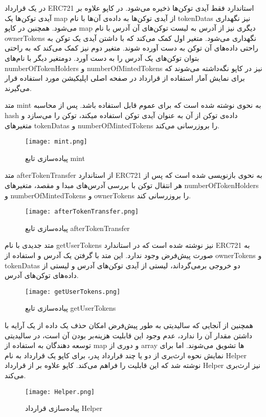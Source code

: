 در یک قرارداد ERC721 استاندارد فقط آیدی توکن‌ها ذخیره می‌شود. در کاپو علاوه بر آیدی توکن‌ها یک map از آیدی توکن‌ها به داده‌ی آن‌ها با نام tokenDatas نیز نگهداری می‌شود. همچنین در کاپو map دیگری نیز از آدرس به لیست توکن‌های آن آدرس با نام ownerTokens نگهداری می‌شود. متغیر اول کمک می‌کند که با داشتن آیدی یک توکن به راحتی داده‌های آن توکن به دست آورده شوند. متغیر دوم نیز کمک می‌کند که به راحتی بتوان توکن‌های یک آدرس را به دست آورد. دومتغیر دیگر با نام‌های numberOfTokenHolders و numberOfMintedTokens نیز در کاپو نگه‌داشته می‌شوند که برای نمایش آمار استفاده از قرارداد در صفحه اصلی اپلیکیشن مورد استفاده قرار می‌گیرند.

متد mint به نحوی نوشته شده است که برای عموم قابل استفاده باشد. پس از محاسبه hash داده‌ی توکن از آن به عنوان آیدی توکن استفاده میکند، توکن را می‌سازد و متغیرهای tokenDatas و numberOfMintedTokens را بروزرسانی می‌کند.

\begin{figure}[ht]
\centerline{\texttt{[image: mint.png]}}
\caption{پیاده‌سازی تابع mint}
\label{fig:mint}
\end{figure}

متد afterTokenTransfer از استاندارد ERC721 به نحوی بازنویسی
شده است که پس از هر انتقال توکن با بررسی آدرس‌های مبدا و مقصد، متغیر‌های numberOfTokenHolders و numberOfMintedTokens و ownerTokens را بروزرسانی کند.

\begin{figure}[ht]
\centerline{\texttt{[image: afterTokenTransfer.png]}}
\caption{پیاده‌سازی تابع afterTokenTransfer}
\label{fig:afterTokenTransfer}
\end{figure}

متد جدیدی با نام getUserTokens نیز نوشته شده است که در استاندارد ERC721 به صورت پیش‌فرض وجود ندارد. این متد با گرفتن یک آدرس و استفاده از ownerTokens و tokenDatas دو خروجی برمی‌گرداند، لیستی از آیدی توکن‌های آدرس و لیستی از داده‌های توکن‌های آدرس.

\begin{figure}[ht]
\centerline{\texttt{[image: getUserTokens.png]}}
\caption{پیاده‌سازی تابع getUserTokens}
\label{fig:getUserTokens}
\end{figure}

همچنین از آنجایی که سالیدیتی به طور پیش‌فرض امکان حذف یک داده از یک آرایه با داشتن مقدار آن را ندارد، عدم وجود این قابلیت هزینه‌بر بودن آن است، در سالیدیتی توسعه دهندگان به استفاده از map و دوری از array ها تشویق می‌شوند. اما برای نمایش نحوه ارث‌بری از دو یا چند قرارداد پدر، برای کاپو یک قرارداد به نام Helper نوشته شد که این قابلیت را فراهم می‌کند. کاپو علاوه بر
از قرارداد Helper نیز ارث‌بری می‌کند.

\begin{figure}[ht]
\centerline{\texttt{[image: Helper.png]}}
\caption{پیاده‌سازی قرارداد Helper}
\label{fig:Helper}
\end{figure}

